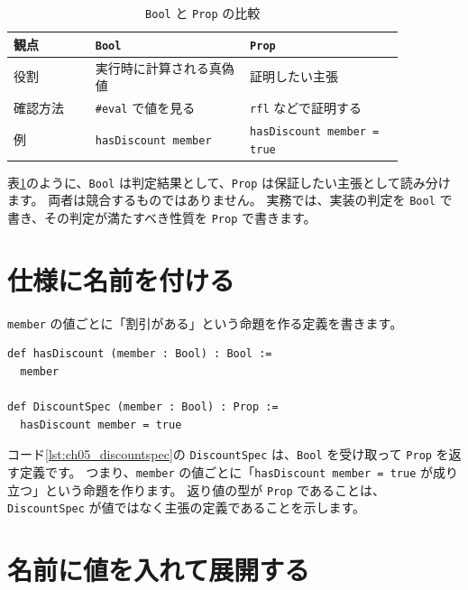 
\begin{table}[htbp]
\centering
\caption{\texttt{Bool} と \texttt{Prop} の比較}
\label{tab:ch05-bool-prop}
\begin{tabular}{p{0.18\linewidth}p{0.34\linewidth}p{0.34\linewidth}}
\toprule
観点 & \texttt{Bool} & \texttt{Prop} \\
\midrule
役割 & 実行時に計算される真偽値 & 証明したい主張 \\
確認方法 & \texttt{\#eval} で値を見る & \texttt{rfl} などで証明する \\
例 & \texttt{hasDiscount member} & \texttt{hasDiscount member = true} \\
\bottomrule
\end{tabular}
\end{table}

表\ref{tab:ch05-bool-prop}のように、\texttt{Bool} は判定結果として、\texttt{Prop} は保証したい主張として読み分けます。
両者は競合するものではありません。
実務では、実装の判定を \texttt{Bool} で書き、その判定が満たすべき性質を \texttt{Prop} で書きます。

\section{仕様に名前を付ける}

\texttt{member} の値ごとに「割引がある」という命題を作る定義を書きます。

\begin{listing}[htbp]
\begin{verbatim}
def hasDiscount (member : Bool) : Bool :=
  member

def DiscountSpec (member : Bool) : Prop :=
  hasDiscount member = true
\end{verbatim}
\caption{\texttt{DiscountSpec}}
\label{lst:ch05_discountspec}
\end{listing}

コード\ref{lst:ch05_discountspec}の \texttt{DiscountSpec} は、\texttt{Bool} を受け取って \texttt{Prop} を返す定義です。
つまり、\texttt{member} の値ごとに「\texttt{hasDiscount member = true} が成り立つ」という命題を作ります。
返り値の型が \texttt{Prop} であることは、\texttt{DiscountSpec} が値ではなく主張の定義であることを示します。

\section{名前に値を入れて展開する}

